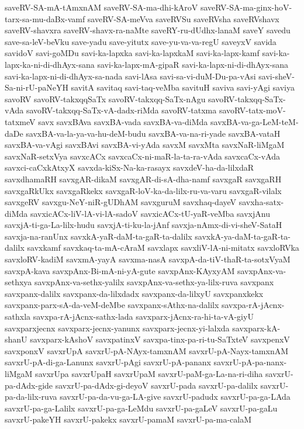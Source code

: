 {saveRV-SA-mA-tAmxnAM
saveRV-SA-ma-dhi-kAroV
saveRV-SA-ma-ginx-hoV-tarx-sa-mu-daBx-vamf
saveRV-SA-meVva
saveRVSu
saveRVsha
saveRVshavx
saveRV-shavxra
saveRV-shavx-ra-naMte
saveRY-ru-dUdhx-lanaM
saveY
savedu
save-sa-leV-beVku
save-yadu
save-yitutx
save-yu-va-va-regU
saveyxV
savida
savidoV
savi-goMDu
savi-ka-lapxka
savi-ka-lapxkaM
savi-ka-lapx-kamf
savi-ka-lapx-ka-ni-di-dhAyx-sana
savi-ka-lapx-mA-gipaR
savi-ka-lapx-ni-di-dhAyx-sana
savi-ka-lapx-ni-di-dhAyx-sa-nada
savi-lAsa
savi-sa-vi-duM-Du-pa-vAsi
savi-sheV-Sa-ni-rU-paNeYH
savitA
savitaq
savi-taq-veMba
savituH
saviva
savi-yAgi
saviya
savoRV
savoRV-takxqqSaTx
savoRV-takxqq-SaTx-nAgu
savoRV-takxqq-SaTx-vAda
savoRV-takxqq-SaTx-vA-dadx-riMda
savoRV-tatxma
savoRV-tatx-moV-tatxmeV
savx
savxBAva
savxBA-vada
savxBA-va-diMda
savxBA-va-ga-LeM-teM-daDe
savxBA-va-la-ya-va-hu-deM-budu
savxBA-va-na-ri-yade
savxBA-vataH
savxBA-va-vAgi
savxBAvi
savxBA-vi-yAda
savxM
savxMta
savxNaR-liMgaM
savxNaR-setxVya
savxcACx
savxcaCx-ni-maR-la-ta-ra-vAda
savxcaCx-vAda
savxci-caCxkAtxyX
savxda-kiSx-Na-ka-rasayx
savxdeV-ha-da-lilxdaR
savxdhamaRH
savxgAR-dikaM
savxgAR-di-sA-dha-namf
savxgaR
savxgaRH
savxgaRkUkx
savxgaRkekx
savxgaR-loV-ka-da-lilx-ru-va-varu
savxgaR-vilalx
savxgeRV
savxgu-NeY-niR-gUDhAM
savxguruM
savxhaq-dayeV
savxha-satx-diMda
savxicACx-liV-lA-vi-lA-sadoV
savxicACx-tU-yaR-veMba
savxjAnu
savxjA-ti-ga-La-lilx-hudu
savxjA-ti-ku-la-jAnf
savxja-nAmx-di-vi-sheV-SataH
savxja-na-ranUnx
savxkA-yaR-daM-ta-gaR-ta-dalilx
savxkA-ya-daM-ta-gaR-ta-dalilx
savxkamf
savxkaq-ta-mA-cAraM
savxlapx
savxliV-lA-ni-mitatx
savxloRVka
savxloRV-kadiM
savxmA-yayA
savxma-nasA
savxpA-da-tiV-thaR-ta-sotxVyaM
savxpA-kava
savxpAnx-Bi-mA-ni-yA-gute
savxpAnx-KAyxyAM
savxpAnx-va-sethxya
savxpAnx-va-sethx-yalilx
savxpAnx-va-sethx-ya-lilx-ruva
savxpanx
savxpanx-dalilx
savxpanx-da-lilxdadx
savxpanx-da-lilxyU
savxpanxkekx
savxpanx-parx-sA-da-veM-deMbe
savxpanx-sAthx-na-dalilx
savxpa-rA-jAcnx-sathxla
savxpa-rA-jAcnx-sathx-lada
savxparx-jAcnx-ra-hi-ta-vA-giyU
savxparxjecnx
savxparx-jecnx-yanunx
savxparx-jecnx-yi-lalxda
savxparx-kA-shanU
savxparx-kAshoV
savxpatinxV
savxpa-tinx-pa-ri-tu-SaTxteV
savxpenxV
savxponxV
savxrUpA
savxrU-pA-NAyx-tamxnAM
savxrU-pA-Nayx-tamxnAM
savxrU-pA-di-ga-Lanunx
savxrU-pAgi
savxrU-pA-pananx
savxrU-pA-pa-nanx-liMgaM
savxrUpa
savxrUpaH
savxrUpaM
savxrU-paM-ga-La-na-ri-diha
savxrU-pa-dAdx-gide
savxrU-pa-dAdx-gi-deyoV
savxrU-pada
savxrU-pa-dalilx
savxrU-pa-da-lilx-ruva
savxrU-pa-da-vu-ga-LA-give
savxrU-padudx
savxrU-pa-ga-LAda
savxrU-pa-ga-Lalilx
savxrU-pa-ga-LeMdu
savxrU-pa-gaLeV
savxrU-pa-gaLu
savxrU-pakeYH
savxrU-pakekx
savxrU-pamaM
savxrU-pa-ma-calaM
}
